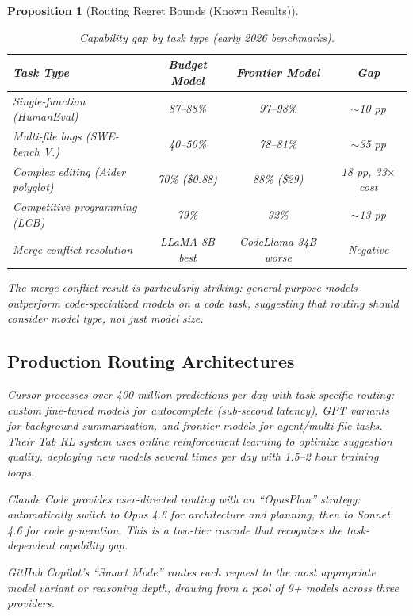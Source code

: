 \documentclass[11pt, a4paper, logo, copyright]{googledeepmind}
\newtheorem{proposition}{Proposition}[section]
\begin{document}
\begin{proposition}[Routing Regret Bounds (Known Results)]
\begin{table}[htbp]
\centering
\caption{Capability gap by task type (early 2026 benchmarks).}
\label{tab:capgaps}
\begin{tabular}{lccc}
\toprule
\textbf{Task Type} & \textbf{Budget Model} & \textbf{Frontier Model} & \textbf{Gap} \\
\midrule
Single-function (HumanEval) & 87--88\% & 97--98\% & $\sim$10 pp \\
Multi-file bugs (SWE-bench V.) & 40--50\% & 78--81\% & $\sim$35 pp \\
Complex editing (Aider polyglot) & 70\% (\$0.88) & 88\% (\$29) & 18 pp, 33$\times$ cost \\
Competitive programming (LCB) & 79\% & 92\% & $\sim$13 pp \\
Merge conflict resolution & LLaMA-8B best & CodeLlama-34B worse & Negative \\
\bottomrule
\end{tabular}
\end{table}

The merge conflict result \citep{zhu2024congra} is particularly striking: general-purpose models outperform code-specialized models on a code task, suggesting that routing should consider model \emph{type}, not just model \emph{size}.

\subsection{Production Routing Architectures}

Cursor processes over 400 million predictions per day with task-specific routing: custom fine-tuned models for autocomplete (sub-second latency), GPT variants for background summarization, and frontier models for agent/multi-file tasks. Their Tab RL system uses online reinforcement learning to optimize suggestion quality, deploying new models several times per day with 1.5--2 hour training loops.

Claude Code provides user-directed routing with an ``OpusPlan'' strategy: automatically switch to Opus 4.6 for architecture and planning, then to Sonnet 4.6 for code generation. This is a two-tier cascade that recognizes the task-dependent capability gap.

GitHub Copilot's ``Smart Mode'' routes each request to the most appropriate model variant or reasoning depth, drawing from a pool of 9+ models across three providers.



\end{proposition}
\end{document}
